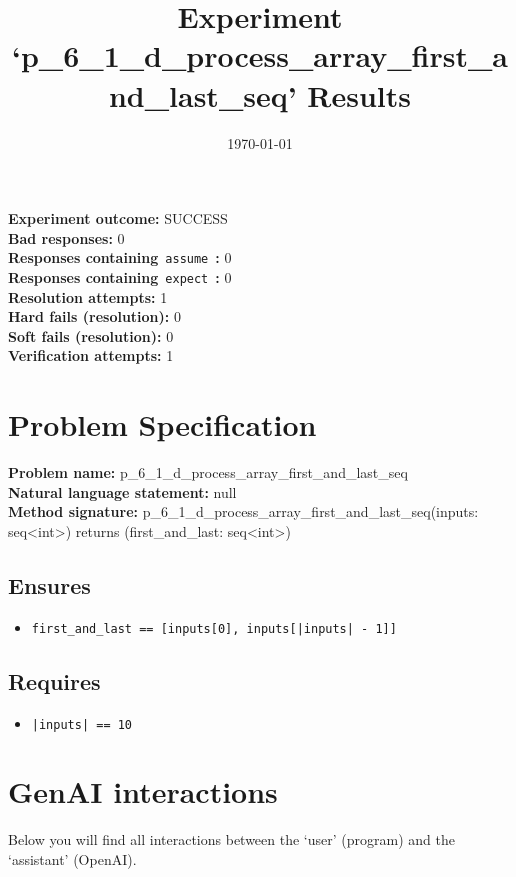 \documentclass{article}
\begin{document}
\title{Experiment `p\_6\_1\_d\_process\_array\_first\_and\_last\_seq' Results}
\author{\today}
\date{}
\maketitle
\textbf{Experiment outcome: }SUCCESS
\\\textbf{Bad responses: }0
\\\textbf{Responses containing}~\texttt{assume}~\textbf{: }0
\\\textbf{Responses containing}~\texttt{expect}~\textbf{: }0
\\\textbf{Resolution attempts: }1
\\\textbf{Hard fails (resolution): }0
\\\textbf{Soft fails (resolution): }0
\\\textbf{Verification attempts: }1
\section*{Problem Specification}
\textbf{Problem name: }p\_6\_1\_d\_process\_array\_first\_and\_last\_seq
\\\textbf{Natural language statement: }null
\\\textbf{Method signature: }p\_6\_1\_d\_process\_array\_first\_and\_last\_seq(inputs: seq<int>) returns (first\_and\_last: seq<int>)
\subsection*{Ensures}
\begin{itemize}
\item \texttt{first\_and\_last == [inputs[0], inputs[|inputs| - 1]]}
\end{itemize}
\subsection*{Requires}
\begin{itemize}
\item \texttt{|inputs| == 10}
\end{itemize}
\clearpage
\section*{GenAI interactions}
Below you will find all interactions between the `user' (program) and the `assistant' (OpenAI).
\end{document}
